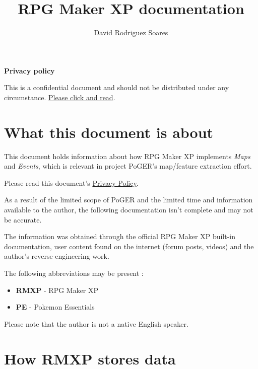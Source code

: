 \documentclass[11pt]{article}
\title{RPG Maker XP documentation}
\author{David Rodriguez Soares}
\begin{document}
\maketitle

\vspace*{\fill}

\textbf{Privacy policy}

This is a confidential document and should not be distributed under any circumstance. \hyperref[sec:privacypolice]{Please click and read}.

\vspace{20mm}

\newpage

\begingroup
\hypersetup{linkcolor=black}
\tableofcontents
\endgroup

\newpage
\section{What this document is about}


This document holds information about how RPG Maker XP implements \textit{Maps} and \textit{Events}, which is relevant in project PoGER's map/feature extraction effort.

Please read this document's \hyperref[sec:privacypolice]{Privacy Policy}.

As a result of the limited scope of PoGER and the limited time and information available to the author, the following documentation isn't complete and may not be accurate.

The information was obtained through the official RPG Maker XP built-in documentation, user content found on the internet (forum posts, videos) and the author's reverse-engineering work.

The following abbreviations may be present :
\begin{itemize}
	\item \textbf{RMXP} - RPG Maker XP
	\item \textbf{PE} - Pokemon Essentials
\end{itemize}

Please note that the author is not a native English speaker.





\newpage
\section{How RMXP stores data}
\end{document}
